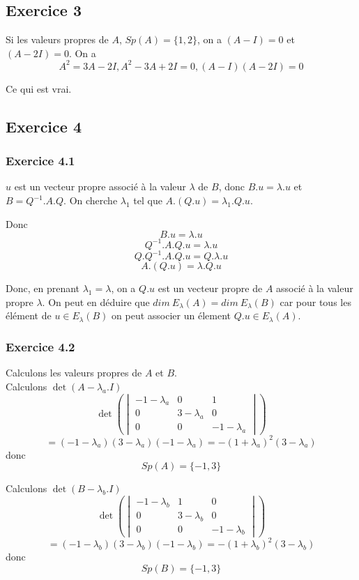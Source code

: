 \documentclass[]{book}
\theoremstyle{definition}
\begin{document}
\subsection*{Exercice 3}
Si les valeurs propres de $A$, $Sp(A) = \{1,2\}$, on a $(A-I) = 0$ et $(A-2I) = 0$. On a 
$$A^2 = 3A - 2I, A^2-3A+2I = 0, (A-I)(A-2I) = 0$$

Ce qui est vrai.

\subsection*{Exercice 4}
\subsubsection*{Exercice 4.1}
$u$ est un vecteur propre associ\'e \`a la valeur $\lambda$ de $B$, donc $B.u = \lambda.u$ et $B=Q^{-1}.A.Q$.
On cherche $\lambda_1$ tel que $A.(Q.u) = \lambda_1.Q.u$.  

Donc 
$$B.u = \lambda.u$$
$$Q^{-1}.A.Q.u = \lambda.u$$
$$Q.Q^{-1}.A.Q.u = Q.\lambda.u$$
$$A.(Q.u) = \lambda.Q.u$$  

Donc, en prenant $\lambda_1 = \lambda$, on a $Q.u$ est un vecteur propre de $A$ associ\'e \`a la valeur propre $\lambda$. On peut en d\'eduire que $dim\ E_{\lambda}(A) =  dim\ E_{\lambda}(B)$ car pour tous les \'el\'ement de $u \in E_{\lambda}(B)$ on peut associer un \'element $Q.u \in E_{\lambda}(A)$. 

\subsubsection*{Exercice 4.2}
Calculons les valeurs propres de $A$ et $B$.\\
Calculons $\det(A-\lambda_a.I)$
$$\det \left( \begin{vmatrix} -1 - \lambda_a & 0 & 1 \\ 0 & 3 - \lambda_a & 0 \\  0 & 0 & -1 -\lambda_a \end{vmatrix}\right) $$
$$= (-1-\lambda_a)(3-\lambda_a)(-1-\lambda_a) = -(1+\lambda_a)^2(3-\lambda_a)$$
donc
$$Sp(A) = \{-1,3\}$$

Calculons $\det(B-\lambda_b.I)$
$$\det \left( \begin{vmatrix} -1 - \lambda_b & 1 & 0 \\ 0 & 3 - \lambda_b & 0 \\  0 & 0 & -1 -\lambda_b \end{vmatrix}\right) $$
$$= (-1-\lambda_b)(3-\lambda_b)(-1-\lambda_b) = -(1+\lambda_b)^2(3-\lambda_b)$$
donc
$$Sp(B) = \{-1,3\}$$
\end{document}
